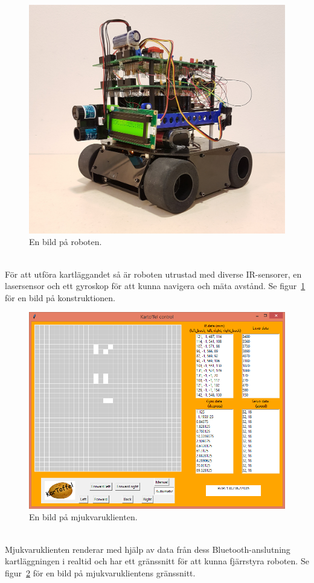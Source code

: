 \documentclass{article}
\begin{document}
\begin{figure}[H]
\centering
\includegraphics[scale=0.1]{robot_irl}
\caption{En bild på roboten.}
\label{fig:robot_bild}
\end{figure}
\ \\
För att utföra kartläggandet så är roboten utrustad med diverse IR-sensorer, en lasersensor och ett gyroskop för att kunna navigera och mäta avstånd. Se figur~\ref{fig:robot_bild} för en bild på konstruktionen.

\begin{figure}[H]
\centering
\includegraphics[scale=0.55]{client_interface}
\caption{En bild på mjukvaruklienten.}
\label{fig:klient_bild}
\end{figure}
\ \\
Mjukvaruklienten renderar med hjälp av data från dess Bluetooth-anslutning kartläggningen i realtid och har ett gränssnitt för att kunna fjärrstyra roboten. Se figur~\ref{fig:klient_bild} för en bild på mjukvaruklientens gränssnitt.
\end{document}
